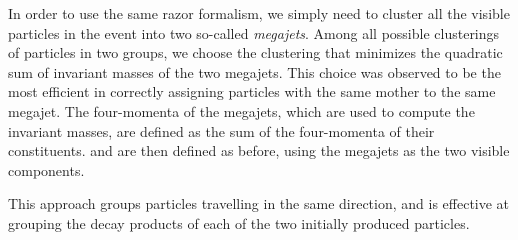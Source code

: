 In order to use the same razor formalism, we simply need to cluster all the visible particles in the
event into two so-called \textit{megajets}. 
Among all possible clusterings of particles in two groups, we
choose the clustering that minimizes the quadratic sum of invariant masses of the two megajets. 
This choice was observed to be the most efficient in correctly assigning particles with the same
mother to the same megajet. 
The four-momenta of the megajets, which are used to compute the invariant masses, are defined as the
sum of the four-momenta of their constituents. \mr and \rsq are then defined as before, using the
megajets as the two visible components. 

This approach groups particles travelling in the same direction, and is effective at grouping the
decay products of each of the two initially produced particles. 



